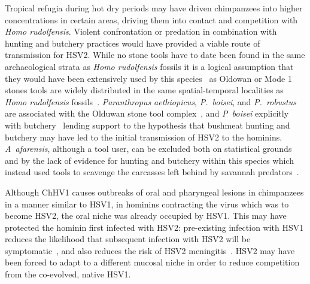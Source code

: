 \documentclass[fleqn,10pt]{wlscirep}
\begin{document}
Tropical refugia during hot dry periods may have driven chimpanzees into higher concentrations in certain areas, driving them into contact and competition with \textit{Homo rudolfensis}. Violent confrontation or predation in combination with hunting and butchery practices would have provided a viable route of transmission for HSV2.  While no stone tools have to date been found in the same archaeological strata as \textit{Homo rudolfensis} fossils it is a logical  assumption that they would have been extensively used by this species~\cite{Ungar2006,DelaTorre2003} as Oldowan or Mode 1 stones tools are widely distributed in the same spatial-temporal localities as \textit{Homo rudolfensis} fossils~\cite{stern1993structure,Leakey2012}. \textit{Paranthropus aethiopicus}, \textit{P.~boisei}, and \textit{P.~robustus} are associated with the Olduwan stone tool complex~\cite{DeHeinzelin1999}, and \textit{P~boisei} explicitly with butchery~\cite{Dominguez-Rodrigo2013} lending support to the hypothesis that bushmeat hunting and butchery may have led to the initial transmission of HSV2 to the hominins. \textit{A~afarensis}, although a tool user, can be excluded both on statistical grounds and by the lack of evidence for hunting and butchery within this species which instead used tools to scavenge the carcasses left behind by savannah predators~\cite{Dominguez-Rodrigo2010,Domalain2016}.

Although ChHV1 causes outbreaks of oral and pharyngeal lesions in chimpanzees in a manner similar to HSV1, in hominins contracting the virus which was to become HSV2, the oral niche was already occupied by HSV1. This may have protected the hominin first infected with HSV2: pre-existing infection with HSV1 reduces the likelihood that subsequent infection with HSV2 will be symptomatic~\cite{Langenberg1999}, and also reduces the risk of HSV2 meningitis~\cite{Aurelius2012}. HSV2 may have been forced to adapt to a different mucosal niche in order to reduce competition from the co-evolved, native HSV1.
\end{document}
